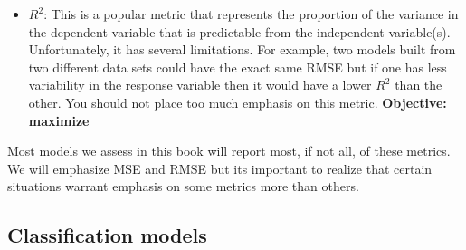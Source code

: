 \documentclass[]{krantz}
\begin{document}
\begin{itemize}
\item
  \textbf{\(R^2\)}: This is a popular metric that represents the proportion of the variance in the dependent variable that is predictable from the independent variable(s). Unfortunately, it has several limitations. For example, two models built from two different data sets could have the exact same RMSE but if one has less variability in the response variable then it would have a lower \(R^2\) than the other. You should not place too much emphasis on this metric. \textbf{Objective: maximize}
\end{itemize}

Most models we assess in this book will report most, if not all, of these metrics. We will emphasize MSE and RMSE but its important to realize that certain situations warrant emphasis on some metrics more than others.

\hypertarget{classification-models}{%
\subsection{Classification models}\label{classification-models}}
\end{document}

